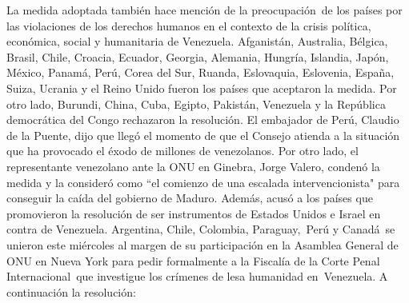 \documentclass{article}%
\begin{document}
\newline%
%
La medida adoptada también hace mención de la preocupación~de los países por las violaciones de los derechos humanos en el contexto de la crisis política, económica, social y humanitaria de Venezuela.%
\newline%
%
Afganistán, Australia, Bélgica, Brasil, Chile, Croacia, Ecuador, Georgia, Alemania, Hungría, Islandia, Japón, México, Panamá, Perú, Corea del Sur, Ruanda, Eslovaquia, Eslovenia, España, Suiza, Ucrania y el Reino Unido fueron los países que aceptaron la medida.%
\newline%
%
Por otro lado, Burundi, China, Cuba, Egipto, Pakistán, Venezuela y la República democrática del Congo rechazaron la resolución.%
\newline%
%
El embajador de Perú, Claudio de la Puente, dijo que llegó el momento de que el Consejo atienda a la situación que ha provocado el éxodo de millones de venezolanos.%
\newline%
%
Por otro lado, el representante venezolano ante la ONU en Ginebra, Jorge Valero, condenó la medida y la consideró como “el comienzo de una escalada intervencionista" para conseguir la caída del gobierno de Maduro. Además, acusó a los países que promovieron la resolución de ser instrumentos de Estados Unidos e Israel en contra de Venezuela.%
\newline%
%
Argentina, Chile, Colombia, Paraguay,~Perú y Canadá~se unieron este miércoles al margen de su participación en la Asamblea General de ONU en Nueva York para pedir formalmente a la Fiscalía de la Corte Penal Internacional~que investigue los crímenes de lesa humanidad en~Venezuela.%
\newline%
%
A continuación la resolución:%
\newline%
%
\end{document}
